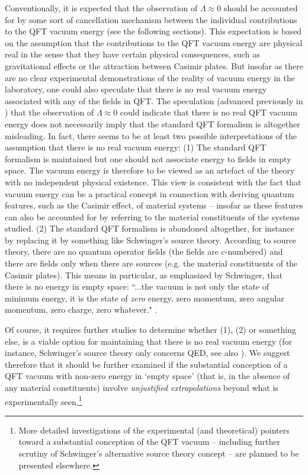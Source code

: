 \documentclass[12pt]{article}
\begin{document}
Conventionally, it is expected that the observation of $\Lambda
\approx 0$ should be accounted for by some sort of cancellation
mechanism between the individual contributions to the QFT vacuum
energy (see the following sections). This expectation is based on
the assumption that the contributions to the QFT vacuum energy are
physical real in the sense that they have certain physical
consequences, such as gravitational effects or the attraction
between Casimir plates. But insofar as there are no clear
experimental demonstrations of the reality of vacuum energy in the
laboratory, one could also speculate that there is no real vacuum
energy associated with any of the fields in QFT. The speculation
(advanced previously in \cite{rugh96,rugh98}) that the observation
of $\Lambda \approx 0$ could indicate that there is no real QFT
vacuum energy does not necessarily imply that the standard QFT
formalism is altogether misleading. In fact, there seems to be at
least two possible interpretations of the assumption that there is
no real vacuum energy: (1) The standard QFT formalism is
maintained but one should not associate energy to fields in empty
space. The vacuum energy is therefore to be viewed as an artefact
of the theory with no independent physical existence. This view is
consistent with the fact that vacuum energy can be a practical
concept in connection with deriving quantum features, such as the
Casimir effect, of material systems -- insofar as these features
can also be accounted for by referring to the material
constituents of the systems studied. (2) The standard QFT
formalism is abandoned altogether, for instance by replacing it by
something like Schwinger's source theory. According to source
theory, there are no quantum operator fields (the fields are
c-numbered) and there are fields only when there are sources (e.g.
the material constituents of the Casimir plates). This means in
particular, as emphasized by Schwinger, that there is no energy in
empty space: ``...the vacuum is not only the state of minimum
energy, it is the state of {\em zero} energy, zero momentum, zero
angular momentum, zero charge, zero whatever." \cite{schwinger73}.

Of course, it requires further studies to determine whether (1),
(2) or something else, is a viable option for maintaining that
there is no real vacuum energy (for instance, Schwinger's source
theory only concerns QED, see also \cite{rugh98}). We suggest
therefore that it should be further examined if the substantial
conception of a QFT vacuum with non-zero energy in `empty space'
(that is, in the absence of any material constituents) involve
{\em unjustified extrapolations} beyond what is experimentally
seen.\footnote{More detailed investigations of the experimental
(and theoretical) pointers toward a substantial conception of the
QFT vacuum -- including further scrutiny of Schwinger's
alternative source theory concept -- are planned to be presented
elsewhere.} 
\end{document}
